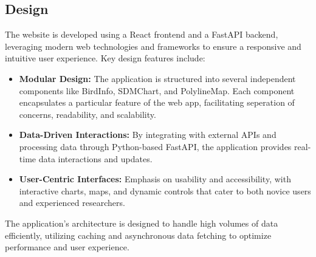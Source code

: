 \documentclass{article}
\begin{document}
\subsection{Design}
The website is developed using a React frontend and a FastAPI backend, leveraging modern web technologies and frameworks to ensure a responsive and intuitive user experience. Key design features include:

\begin{itemize}
    \item \textbf{Modular Design:} The application is structured into several independent components like BirdInfo, SDMChart, and PolylineMap. Each component encapsulates a particular feature of the web app, facilitating seperation of concerns, readability, and scalability.
    \item \textbf{Data-Driven Interactions:} By integrating with external APIs and processing data through Python-based FastAPI, the application provides real-time data interactions and updates.
    \item \textbf{User-Centric Interfaces:} Emphasis on usability and accessibility, with interactive charts, maps, and dynamic controls that cater to both novice users and experienced researchers.
\end{itemize}

The application's architecture is designed to handle high volumes of data efficiently, utilizing caching and asynchronous data fetching to optimize performance and user experience.
\end{document}
